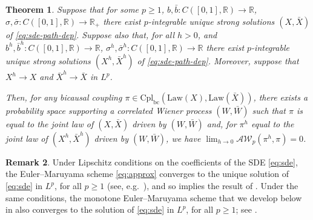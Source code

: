 \documentclass[oneside]{amsart}
\newtheorem{theorem}{Theorem}[section]
\theoremstyle{definition}
\newtheorem{remark}[theorem]{Remark}
\newcommand{\AW}{\mathcal A\mathcal W}
\newcommand{\Law}{\mathrm{Law}}
\newcommand{\R}{\mathbb R}
\newcommand{\cpl}{\mathrm{Cpl}}
\newcommand{\cplba}{\cpl_{\mathrm{bc}}}
\def\R{{\mathbb R}}
\numberwithin{equation}{section}
\begin{document}
\begin{theorem}\label{thm:convergence-general}
	Suppose that for some $p \ge 1$, $b, \bar b\colon C([0, 1], \R) \to \R$, $\sigma, \bar \sigma\colon C([0, 1], \R) \to \R_+$ there exist $p$-integrable unique strong solutions $(X, \bar X)$ of \eqref{eq:sde-path-dep}. Suppose also that, for all $h > 0$, and $b^h, \bar b^h\colon C([0, 1], \R) \to \R$, $\sigma^h, \bar \sigma^h\colon C([0, 1], \R) \to \R$ there exist $p$-integrable unique strong solutions $(X^h, \bar X^h)$ of \eqref{eq:sde-path-dep}. Moreover, suppose that $X^h \to X$ and $\bar X^h \to \bar X$ in $L^p$.
	
	Then, for any bicausal coupling $\pi \in \cplba(\Law(X), \Law(\bar X))$, there exists a probability space supporting a correlated Wiener process $(W, \bar{W})$ such that $\pi$ is equal to the joint law of $(X, \bar X)$ driven by $(W, \bar W)$ and, for $\pi^h$ equal to the joint law of $(X^h, \bar X^h)$ driven by $(W, \bar W)$, we have
$
		\lim_{h \to 0}\AW_p(\pi^h, \pi) = 0
$.
\end{theorem}

\begin{remark}\label{rem:convergence-EM-aw}
	Under Lipschitz conditions on the coefficients of the SDE \eqref{eq:sde}, the Euler--Maruyama scheme \eqref{eq:approx} converges to the unique solution of \eqref{eq:sde} in $L^p$, for all $p \ge 1$ (see, e.g.\ \cite{KlPl92}), and so  implies the result of . Under the same conditions, the monotone Euler--Maruyama scheme that we develop below in  also converges to the solution of \eqref{eq:sde} in $L^p$, for all $p \geq 1$; see .
\end{remark}
\end{document}
